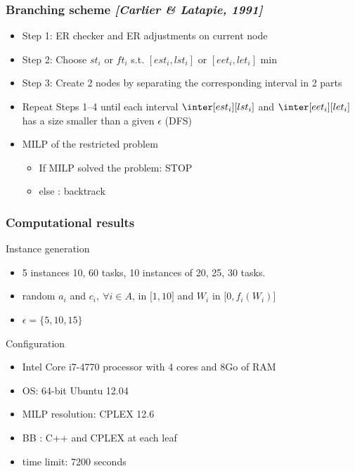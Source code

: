 \begin{frame}
  \frametitle{Branching scheme {\small \it \color{gray!50!black!50} [Carlier \& Latapie, 1991]}}
  \begin{itemize}
    \vfill
  \item Step 1: ER checker and ER adjustments on current node 
    \vfill    
  \item Step 2: Choose $st_i$ or $ft_i$ s.t. $[est_i,lst_i]$ or
    $[eet_i,let_i]$ min
    \vfill
  \item Step 3: Create 2 nodes by separating the corresponding interval in 2 parts
    \vfill
  \item Repeat Steps 1--4 until each interval $\inter[est_i][lst_i]$ and $\inter[eet_i][let_i]$ has a size smaller than a given $\epsilon$ (DFS)
    \vfill
  \item MILP of the restricted problem
    \begin{itemize}
    \item If MILP solved the problem: STOP
    \item else : backtrack
    \end{itemize}
  \end{itemize}
  \vfill
\end{frame}


\begin{frame}
  \frametitle{Computational results}
\vfill
  \begin{block}{Instance generation}
    \begin{itemize}
    \item 5 instances 10, 60 tasks, 10 instances of 20, 25, 30 tasks. 
    \item random  $a_i$ and $c_i,\ \forall i \in A$, in ${[}1,10{]}$
      and $W_i$ in ${[}0,f_i(W_i){]}$
    \item $\epsilon = \{5, 10, 15\}$ 
    \end{itemize}
  \end{block}
\vfill
\pause
  \begin{block}{Configuration}
    \begin{itemize}
    \item Intel Core i7-4770 processor with 4 cores and 8Go of RAM
    \item OS: 64-bit Ubuntu 12.04
    \item MILP resolution: CPLEX 12.6  
    \item BB : C++ and CPLEX at each leaf
    \item time limit: 7200 seconds
    \end{itemize}
  \end{block}
  \vfill
\end{frame}


